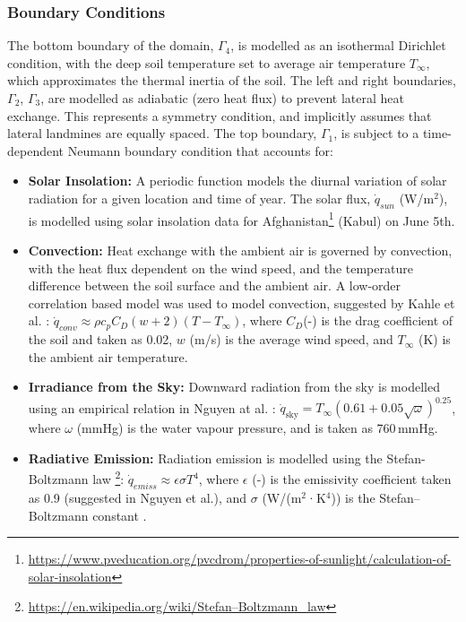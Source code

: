     \subsubsection{Boundary Conditions} 
    
        The bottom boundary of the domain, $\Gamma_4$, is modelled as an isothermal Dirichlet condition, with the deep soil temperature set to average air temperature $T_{\infty}$, which approximates the thermal inertia of the soil. The left and right boundaries, $\Gamma_2$, $\Gamma_3$,  are modelled as adiabatic (zero heat flux) to prevent lateral heat exchange. This represents a symmetry condition, and implicitly assumes that lateral landmines are equally spaced. The top boundary, $\Gamma_1$,  is subject to a time-dependent Neumann boundary condition that accounts for:
    
        \begin{itemize}
        
            \item \textbf{Solar Insolation:} A periodic function models the diurnal variation of solar radiation for a given location and time of year. The solar flux,  $\dot{q}_{sun}$  (W/m$^2$), is modelled using solar insolation data for Afghanistan\footnote{\url{https://www.pveducation.org/pvcdrom/properties-of-sunlight/calculation-of-solar-insolation}} (Kabul) on June 5th.
            
            \item \textbf{Convection:} Heat exchange with the ambient air is governed by convection, with the heat flux dependent on the wind speed, and the temperature difference between the soil surface and the ambient air. A low-order correlation based model was used to model convection, suggested by Kahle et al. \cite{kahle1997model}: $\dot{q}_{conv} \approx \rho c_p C_D(w+2)(T - T_{\infty})$, where \(C_D\)(-) is the drag coefficient of the soil and taken as 0.02, \(w\) (m/s) is the average wind speed, and \(T_\infty\) (K) is the ambient air temperature.
            
            \item \textbf{Irradiance from the Sky:} Downward radiation from the sky is modelled using an empirical relation in Nguyen at al. \cite{nguyen2008inverse}: $\dot{q}_{\text{sky}} = T_{\infty} \left( 0.61 + 0.05 \sqrt{\omega} \right)^{0.25}$, where \(\omega\) (mmHg) is the water vapour pressure, and is taken as 760\,mmHg.
            
            \item \textbf{Radiative Emission:} Radiation emission is modelled using the Stefan-Boltzmann law \footnote{\url{https://en.wikipedia.org/wiki/Stefan–Boltzmann_law}}: $\dot{q}_{emiss} \approx \epsilon \sigma T^4$, where \(\epsilon\) (-) is the emissivity coefficient taken as 0.9 (suggested in Nguyen et al.), and \(\sigma\) (W/(m$^2$·K$^4$)) is the Stefan–Boltzmann constant .
            
        \end{itemize}
    
